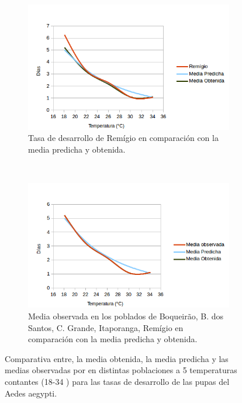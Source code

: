 \begin{figure}[!htbp]
\begin{subfigure}[b]{0.45\textwidth}
    \end{subfigure}
    \begin{subfigure}[t]{0.45\textwidth}
            \includegraphics[width=\textwidth]{capitulo-6/graphics/desarrollo-pupa-5.png}
            \caption{Tasa de desarrollo de Remígio en comparación con la media predicha y obtenida.}
    \end{subfigure}
    ~~~~
    \begin{subfigure}[t]{0.45\textwidth}
            \includegraphics[width=\textwidth]{capitulo-6/graphics/desarrollo-pupa-6.png}
            \caption{Media observada en los poblados de Boqueirão, B. dos Santos, C. Grande, Itaporanga, Remígio en comparación con la media predicha y obtenida.}

    \end{subfigure}

    \caption{\label{fig:desarrollo-pupa-baserra2006}
    Comparativa entre, la media obtenida, la media predicha y las medias observadas por \cite{
    BESERRA2006} en distintas poblaciones a 5 temperaturas contantes (18-34 \textcelsius) para
    las tasas de desarrollo de las pupas del Aedes aegypti.}

\end{figure}
